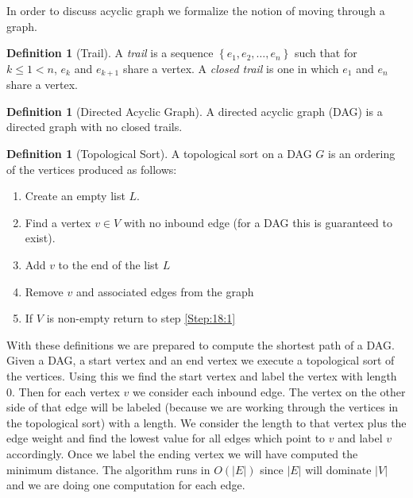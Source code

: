 \documentclass[oneside,12pt]{book}   	%
\newcounter{ex}
\newcounter{def}
\newcounter{pr}
\theoremstyle{definition}
\newtheorem{definition}[thm]{Definition}
\newcommand{\set}[1]{\left\{#1\right\}}
\newcommand{\order}[1]{\left| #1 \right|}
\begin{document}
\begin{spacing}{1.618}
			In order to discuss acyclic graph we formalize the notion of moving through a graph. 
			
			\begin{definition}[Trail]
				A \emph{trail} is a sequence $\set{e_1, e_2, \dots, e_n}$ such that for $k\leq 1<n$, $e_k$ and $e_{k+1}$ share a vertex. A \emph{closed trail} is one in which $e_1$ and $e_n$ share a vertex. 
			\end{definition}
			
			\begin{definition}[Directed Acyclic Graph]
				A directed acyclic graph (DAG) is a directed graph with no closed trails.
			\end{definition}
			
			\begin{definition}[Topological Sort]
				A topological sort on a DAG $G$ is an ordering of the vertices produced as follows:
				\begin{enumerate}
					\item Create an empty list $L$. 
					\item\label{Step:18:1} Find a vertex $v\in V$ with no inbound edge (for a DAG this is guaranteed to exist). 
					\item Add $v$ to the end of the list $L$ 
					\item Remove $v$ and associated edges from the graph
					\item If $V$ is non-empty return to step \ref{Step:18:1}
				\end{enumerate}
			\end{definition}
			
			With these definitions we are prepared to compute the shortest path of a DAG. Given a DAG, a start vertex and an end vertex we execute a topological sort of the vertices. Using this we find the start vertex and label the vertex with length 0. Then for each vertex $v$ we consider each inbound edge. The vertex on the other side of that edge will be labeled (because we are working through the vertices in the topological sort) with a length. We consider the length to that vertex plus the edge weight and find the lowest value for all edges which point to $v$ and label $v$ accordingly. Once we label the ending vertex we will have computed the minimum distance. The algorithm runs in $O\left(\order{E}\right)$ since $\order{E}$ will dominate $\order{V}$ and we are doing one computation for each edge. 
		

\end{spacing}
\end{document}
